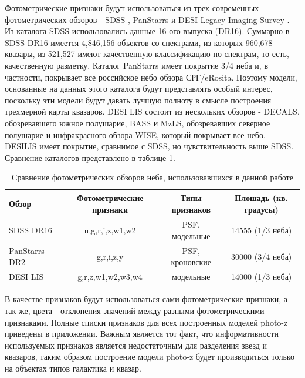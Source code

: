 \documentclass[fleqn,usenatbib]{mnras}
\begin{document}
Фотометрические признаки будут использоваться из трех современных фотометрических обзоров - SDSS \cite{bib:sdss}, PanStarrs \cite{bib:panstarrs} и DESI Legacy Imaging Survey \cite{bib:desi}. Из каталога SDSS использовались данные 16-ого выпуска (DR16). Суммарно в SDSS DR16 имеется 4,846,156 объектов со спектрами, из которых 960,678 - квазары, из 521,527 имеют качественную классификацию по спектрам, то есть, качественную разметку. Каталог PanStarrs имеет покрытие 3/4 неба и, в частности, покрывает все российское небо обзора СРГ/eRosita. Поэтому модели, основанные на данных этого каталога будут представлять особый интерес, поскольку эти модели будут давать лучшую полноту в смысле построения трехмерной карты квазаров. DESI LIS состоит из нескольких обзоров - DECALS, обозревавшего южное полушарие, BASS и MzLS, обозревавших северное полушарие и инфракрасного обзора WISE, который покрывает все небо. DESILIS имеет покрытие, сравнимое с SDSS, но чувствительность выше SDSS. Сравнение каталогов представлено в таблице \ref{tab:catalogs_comparison}.

\begin{table}[ht]
    \caption{Сравнение фотометрических обзоров неба, использовавшихся в данной работе}
    \label{tab:catalogs_comparison}
    \centering
    \begin{tabular}{|l|c|c|c|}
    \hline
        Обзор & Фотометрические признаки & Типы признаков & Плошадь (кв. градусы) \\
    \hline
        SDSS DR16 & u,g,r,i,z,w1,w2 & PSF, модельные & 14555 (1/3 неба) \\
        PanStarrs DR2 & g,r,i,z,y & PSF, кроновские & 30000 (3/4 неба) \\
        DESI LIS & g,r,z,w1,w2,w3,w4 & модельные & 14000 (1/3 неба) \\[1ex]
        \hline
    \end{tabular}
\end{table}

В качестве признаков будут использоваться сами фотометрические признаки, а так же, цвета - отклонения значений между разными фотометрическими признаками. Полные списки признаков для всех построенных моделей photo-z приведены в приложении. Важным является тот факт, что информативности используемых признаков является недостаточным для разделения звезд и квазаров, таким образом построение модели photo-z будет производиться только на объектах типов галактика и квазар.
\end{document}
